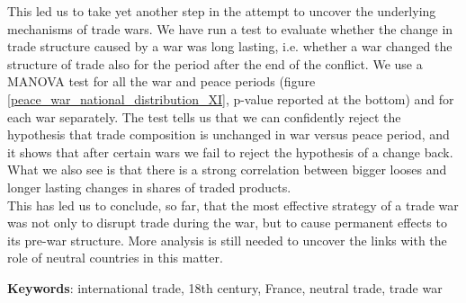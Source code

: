 \documentclass[12pt,a4paper,notitlepage]{article}
\begin{document}
This led us to take yet another step in the attempt to uncover the underlying mechanisms of trade wars. We have run a test to evaluate whether the change in trade structure caused by a war was long lasting, i.e. whether a war changed the structure of trade also for the period after the end of the conflict. We use a MANOVA test for all the war and peace periods (figure \ref{peace_war_national_distribution_XI}, p-value reported at the bottom) and for each war separately. The test tells us that we can confidently reject the hypothesis that trade composition is unchanged in war versus peace period, and it shows that after certain wars we fail to reject the hypothesis of a change back. What we also see is that there is a strong correlation between bigger looses and longer lasting changes in shares of traded products. \\
This has led us to conclude, so far, that the most effective strategy of a trade war was not only to disrupt trade during the war, but to cause permanent effects to its pre-war structure. More analysis is still needed to uncover the links with the role of neutral countries in this matter.





\textbf{Keywords}: international trade, 18th century, France, neutral trade, trade war


\renewcommand{\baselinestretch}{1.0}\normalsize


\end{document}
